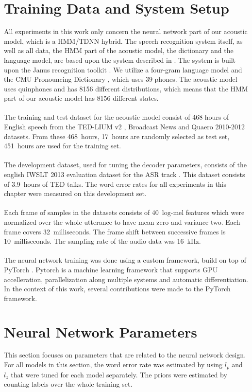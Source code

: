 \section{Training Data and System Setup}
All experiments in this work only concern the neural network part of our acoustic model, which is a HMM/TDNN hybrid. The speech recognition system itself, as well as all data, the HMM part of the acoustic model, the dictionary and the language model, are based upon the system described in \cite{nguyen20162016}. The system is built upon the Janus recognition toolkit \cite{finke1997karlsruhe}. We utilize a four-gram language model and the CMU Pronouncing Dictionary \cite{cmudict}, which uses 39 phones. The acoustic model uses quinphones and has 8156 different distributions, which means that the HMM part of our acoustic model has 8156 different states. \\ \\
The training and test dataset for the acoustic model consist of 468 hours of English speech from the TED-LIUM v2 \cite{rousseau2014enhancing}, Broadcast News \cite{graff19971996} and Quaero 2010-2012 datasets. From these 468~hours, 17~hours are randomly selected as test set, 451~hours are used for the training set. \\ \\
The development dataset, used for tuning the decoder parameters, consists of the english IWSLT 2013 evaluation dataset for the ASR track \cite{cettolo2013report}. This dataset consists of 3.9~hours of TED talks. The word error rates for all experiments in this chapter were measured on this development set. \\ \\ 
Each frame of samples in the datasets consists of 40~log-mel features which were normalized over the whole utterance to have mean zero and variance two. Each frame covers 32~milliseconds. The frame shift between successive frames is 10~milliseconds. The sampling rate of the audio data was 16~kHz. \\ \\
The neural network training was done using a custom framework, build on top of PyTorch \cite{paszke2017automatic}. Pytorch is a machine learning framework that supports GPU accelleration, parallelization along multiple systems and automatic differentiation. In the context of this work, several contributions were made to the PyTorch framework.  
\section{Neural Network Parameters}
This section focuses on parameters that are related to the neural network design. For all models in this section, the word error rate was estimated by using $l_p$ and $l_z$ that were tuned for each model separately. The priors were estimated by counting labels over the whole training set.
